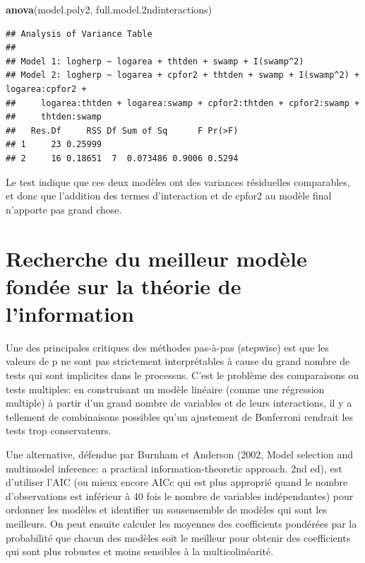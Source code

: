 \documentclass[12pt,]{book}
\newenvironment{Shaded}{\begin{snugshade}}{\end{snugshade}}
\newcommand{\FloatTok}[1]{\textcolor[rgb]{0.00,0.00,0.81}{#1}}
\newcommand{\KeywordTok}[1]{\textcolor[rgb]{0.13,0.29,0.53}{\textbf{#1}}}
\newcommand{\NormalTok}[1]{#1}
\begin{document}
\begin{Shaded}
\begin{Highlighting}[]
\KeywordTok{anova}\NormalTok{(model.poly2, full.model}\FloatTok{.2}\NormalTok{ndinteractions)}
\end{Highlighting}
\end{Shaded}

\begin{verbatim}
## Analysis of Variance Table
## 
## Model 1: logherp ~ logarea + thtden + swamp + I(swamp^2)
## Model 2: logherp ~ logarea + cpfor2 + thtden + swamp + I(swamp^2) + logarea:cpfor2 + 
##     logarea:thtden + logarea:swamp + cpfor2:thtden + cpfor2:swamp + 
##     thtden:swamp
##   Res.Df     RSS Df Sum of Sq      F Pr(>F)
## 1     23 0.25999                           
## 2     16 0.18651  7  0.073486 0.9006 0.5294
\end{verbatim}

Le test indique que ces deux modèles ont des variances résiduelles comparables, et donc que l'addition des termes d'interaction et de cpfor2 au modèle final n'apporte pas grand chose.

\hypertarget{recherche-du-meilleur-moduxe8le-fonduxe9e-sur-la-thuxe9orie-de-linformation}{%
\section{Recherche du meilleur modèle fondée sur la théorie de l'information}\label{recherche-du-meilleur-moduxe8le-fonduxe9e-sur-la-thuxe9orie-de-linformation}}

Une des principales critiques des méthodes pas-à-pas (stepwise) est que les valeurs de p ne sont pas strictement interprétables à cause du grand nombre de tests qui sont implicites dans le processus. C'est le problème des comparaisons ou tests multiples: en construisant un modèle linéaire (comme une régression multiple) à partir d'un grand nombre de variables et de leurs interactions, il y a tellement de combinaisons possibles qu'un ajustement de Bonferroni rendrait les tests trop conservateurs.

Une alternative, défendue par Burnham et Anderson (2002, Model selection and multimodel inference: a practical information-theoretic approach. 2nd ed), est d'utiliser l'AIC (ou mieux encore AICc qui est plus approprié quand le nombre d'observations est inférieur à 40 fois le nombre de variables indépendantes) pour ordonner les modèles et identifier un sousensemble de modèles qui sont les meilleurs. On peut ensuite calculer les moyennes des coefficients pondérées par la probabilité que chacun des modèles soit le meilleur pour obtenir des coefficients qui sont plus robustes et moins sensibles à la multicolinéarité.
\end{document}
